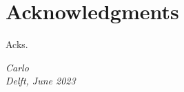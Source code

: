 \chapter*{Acknowledgments}

Acks.

\begin{flushright}
{\itshape
Carlo \\
Delft, June 2023
}
\end{flushright}
